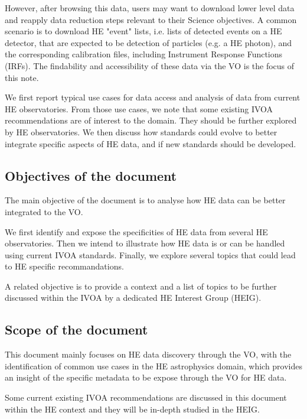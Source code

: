 \documentclass[11pt,a4paper]{ivoa}
\begin{document}
However, after browsing this data, users may want to download lower level data and reapply data reduction steps relevant to their Science objectives. A common scenario is to download HE "event" lists, i.e. lists of detected events on a HE detector, that are expected to be detection of particles (e.g. a HE photon), and the corresponding calibration files, including Instrument Response Functions (IRFs). The findability and accessibility of these data via the VO is the focus of this note.

We first report typical use cases for data access and analysis of data from current HE observatories. From those use
cases, we note that some existing IVOA recommendations are of interest to the domain. They should be further explored
by HE observatories. We then discuss how standards could evolve to better integrate specific aspects of HE data, and if
new standards should be developed.

\subsection{Objectives of the document}

The main objective of the document is to analyse how HE data can be better integrated to the VO.

We  first identify and expose the specificities of HE data from several HE observatories. Then we intend to illustrate how HE data is or can be handled using current IVOA standards. Finally, we explore several topics that could lead to HE specific recommandations.

A related objective is to provide a context and a list of topics to be further discussed within the IVOA by a dedicated HE Interest Group (HEIG).


\subsection{Scope of the document}

This document mainly focuses on HE data discovery through the VO, with the identification of common use cases in the HE astrophysics domain, which provides an insight of the specific metadata to be expose through the VO for HE data.

Some current existing IVOA recommendations are discussed in this document within the HE context and they will be in-depth
studied in the  HEIG.



\end{document}
